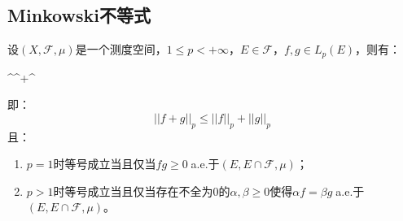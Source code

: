 \subsection{Minkowski不等式}
\begin{theorem}
	设$(X,\mathscr{F},\mu)$是一个测度空间，$1\leqslant p<+\infty$，$E\in\mathscr{F}$，$f,g\in L_p(E)$，则有：
	\begin{inequality*}\label{ineq:Minkowski}
		^\leqslant{}^+^
	\end{inequality*}
	即：
	\begin{equation*}
		||f+g||_p\leqslant||f||_p+||g||_p
	\end{equation*}
	且：
	\begin{enumerate}
		\item $p=1$时等号成立当且仅当$fg\geqslant0\;$a.e.于$(E,E\cap\mathscr{F},\mu)$；
		\item $p>1$时等号成立当且仅当存在不全为$0$的$\alpha,\beta\geqslant0$使得$\alpha f=\beta g\;$a.e.于$(E,E\cap\mathscr{F},\mu)$。
	\end{enumerate}
\end{theorem}
